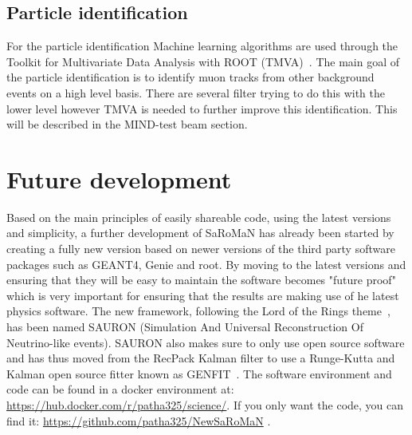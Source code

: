 

\subsection{Particle identification}
For the particle identification Machine learning algorithms are used through the Toolkit for Multivariate Data Analysis with ROOT (TMVA)~\cite{TMVA}. The main goal of the particle identification is to identify muon tracks from other background events on a high level basis. There are several filter trying to do this with the lower level however TMVA is needed to further improve this identification. This will be described in the MIND-test beam section.



\pagebreak
\section{Future development}
Based on the main principles of easily shareable code, using the latest versions and simplicity, a further development of SaRoMaN has already been started by creating a fully new version based on newer versions of the third party software packages such as GEANT4, Genie and root. By moving to the latest versions and ensuring that they will be easy to maintain the software becomes "future proof" which is very important for ensuring that the results are making use of he latest physics software. The new framework, following the Lord of the Rings theme~\cite{79tolkien2012lord}, has been named SAURON (Simulation And Universal Reconstruction Of Neutrino-like events).  SAURON also makes sure to only use open source software and has thus moved from the RecPack Kalman filter to use a Runge-Kutta and Kalman open source fitter known as GENFIT~\cite{81Genfit}.
The software environment and code can be found in  a docker environment at: \url{https://hub.docker.com/r/patha325/science/}. If you only want the code, you can find it: \url{https://github.com/patha325/NewSaRoMaN} .

